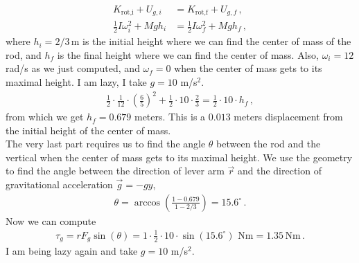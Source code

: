\documentclass[11pt]{article}
\begin{document}
\begin{align*}
K_\text{rot,i} + U_{g,i} &=
K_\text{rot,f} + U_{g,f}\,,\\
\frac{1}{2}I\omega_i^2 + Mg h_i&=\frac{1}{2}I\omega_f^2 +Mg h_f\,, 
\end{align*}
where $h_i =2/3$\,m is the initial height where we can find the center of mass of the rod, and $h_f$ is the final height where we can find the center of mass. Also, $\omega_i = 12$ rad/s as we just computed, and $\omega_f = 0$ when the center of mass gets to its maximal height. I am lazy, I take $g = 10$ m/s$^2$. 
\begin{align*}
\frac{1}{2}\cdot\frac{1}{12}\cdot \left(
\frac{6}{5}
\right)^2 + \frac{1}{2}\cdot 10 \cdot \frac{2}{3} = \frac{1}{2}\cdot 10 \cdot h_f\,,
\end{align*}
from which we get $h_f = 0.679$ meters. This is a $0.013$ meters displacement from the initial height of the center of mass. \\

The very last part requires us to find the angle $\theta$ between the rod and the vertical when the center of mass gets to its maximal height. We use the geometry to find the angle between the direction of lever arm $\vec{r}$ and the direction of gravitational acceleration $\vec{g}= -g \hat{y}$,  
\begin{align*}
\theta = \arccos\left(\frac{1-0.679 }{1-2/3}\right) = 15.6^\circ\,.
\end{align*}
Now we can compute
\begin{align*}
\tau_g = rF_g\sin(\theta) = 1 \cdot \frac{1}{2} \cdot 10 \cdot \sin(15.6^\circ)\,\,\text{Nm} = 1.35\,\text{Nm}\,.
\end{align*}
I am being lazy again and take $g = 10$ m/s$^2$.
\end{document}
